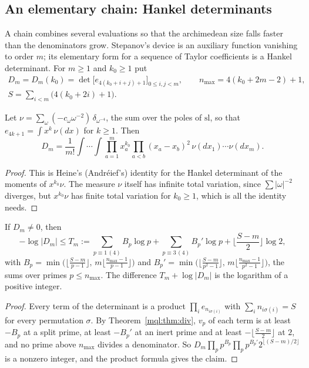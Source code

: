 \subsection{An elementary chain: Hankel determinants}\label{mql:sub:chain}

A chain combines several evaluations so that the archimedean size falls faster than the denominators grow. Stepanov's device is an auxiliary function vanishing to order $m$; its elementary form for a sequence of Taylor coefficients is a Hankel determinant. For $m\ge1$ and $k_0\ge1$ put
\[
\begin{gathered}
D_m=D_m(k_0)=\det\big[e_{4(k_0+i+j)+1}\big]_{0\le i,j<m},\qquad n_{\max}=4(k_0+2m-2)+1,\\
S=\sum_{i<m}\big(4(k_0+2i)+1\big).
\end{gathered}
\]

\begin{proposition}\label{mql:prop:heine}
Let $\nu=\sum_\omega(-c_\omega\omega^{-2})\,\delta_{\omega^{-4}}$, the sum over the poles of $\mathrm{sl}$, so that $e_{4k+1}=\int x^k\,\nu(dx)$ for $k\ge1$. Then
\[
D_m=\frac1{m!}\int\!\cdots\!\int\prod_{a=1}^mx_a^{k_0}\prod_{a<b}(x_a-x_b)^2\,\nu(dx_1)\cdots\nu(dx_m).
\]
\end{proposition}

\begin{proof}
This is Heine's (Andr\'eief's) identity for the Hankel determinant of the moments of $x^{k_0}\nu$. The measure $\nu$ itself has infinite total variation, since $\sum|\omega|^{-2}$ diverges, but $x^{k_0}\nu$ has finite total variation for $k_0\ge1$, which is all the identity needs.
\end{proof}

\begin{theorem}\label{mql:thm:chain}
If $D_m\ne0$, then
\[
-\log|D_m|\le T_m:=\sum_{p\equiv1\,(4)}B_p\log p+\sum_{p\equiv3\,(4)}B_p'\log p+\Big\lfloor\frac{S-m}2\Big\rfloor\log2,
\]
with $B_p=\min\big(\lfloor\frac{S-m}{p-1}\rfloor,\,m\lfloor\frac{n_{\max}-1}{p-1}\rfloor\big)$ and $B_p'=\min\big(\lfloor\frac{S-m}{p^2-1}\rfloor,\,m\lfloor\frac{n_{\max}-1}{p^2-1}\rfloor\big)$, the sums over primes $p\le n_{\max}$. The difference $T_m+\log|D_m|$ is the logarithm of a positive integer.
\end{theorem}

\begin{proof}
Every term of the determinant is a product $\prod_ie_{n_{i\sigma(i)}}$ with $\sum_in_{i\sigma(i)}=S$ for every permutation $\sigma$. By Theorem~\ref{mql:thm:div}, $v_p$ of each term is at least $-B_p$ at a split prime, at least $-B_p'$ at an inert prime and at least $-\lfloor\frac{S-m}2\rfloor$ at $2$, and no prime above $n_{\max}$ divides a denominator. So $D_m\prod_pp^{B_p}\prod_pp^{B_p'}2^{\lfloor(S-m)/2\rfloor}$ is a nonzero integer, and the product formula gives the claim.
\end{proof}

